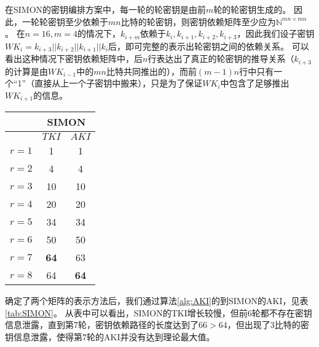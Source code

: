 在SIMON的密钥编排方案中，每一轮的轮密钥是由前$m$轮的轮密钥生成的。
因此，一轮轮密钥至少依赖于$mn$比特的轮密钥，则密钥依赖矩阵至少应为$\mathbb{N}^{mn\times mn}$。
在$n=16,m=4$的情况下，$k_{i+m}$依赖于$k_i,k_{i+1},k_{i+2},k_{i+3}$，因此我们设子密钥$WK_i=k_{i+3}||k_{i+2}||k_{i+1}||k_i$后，即可完整的表示出轮密钥之间的依赖关系。
可以看出这种情况下密钥依赖矩阵中，后$n$行表达出了真正的轮密钥的推导关系（$k_{i+3}$的计算是由$WK_{i-1}$中的$mn$比特共同推出的），而前$(m-1)n$行中只有一个“1”（直接从上一个子密钥中搬来），只是为了保证$WK_i$中包含了足够推出$WK_{i+1}$的信息。

\begin{table}[htbp]
\centering
\begin{tabular}{c|c|c}
\hline
&\multicolumn{2}{c}{SIMON}\\
\hline
&$TKI$&$AKI$\\
\hline
$r=1$ & 1 & 1\\
$r=2$ & 4 & 4\\
$r=3$ & 10 & 10\\
$r=4$ & 20 & 20\\
$r=5$ & 34 & 34\\
$r=6$ & 50 & 50\\
$r=7$ & \textbf{64} & 63\\
$r=8$ & 64 & \textbf{64}\\
\hline
\end{tabular}
\end{table}

确定了两个矩阵的表示方法后，我们通过算法\ref{alg:AKI}的到SIMON的AKI，见表\ref{tab:SIMON}。
从表中可以看出，SIMON的TKI增长较慢，但前6轮都不存在密钥信息泄露，直到第7轮，密钥依赖路径的长度达到了$66>64$，但出现了3比特的密钥信息泄露，使得第7轮的AKI并没有达到理论最大值。


